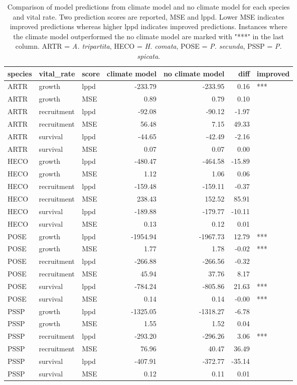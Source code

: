 \begin{table}[ht]
\centering
\caption{Comparison of model predictions from climate model and no climate model for each species and vital rate.  Two prediction scores are reported, MSE and lppd. Lower MSE indicates improved predictions whereas higher lppd indicates improved predictions.  Instances where the climate model outperformed the no climate model are marked with "***" in the last column. ARTR = \textit{A. tripartita}, HECO = \textit{H. comata}, POSE = \textit{P. secunda}, PSSP = \textit{P. spicata}.} 
\label{table:overallPreds}
\begin{tabular}{lllrrrl}
  \hline
species & vital\_rate & score & climate model & no climate model & diff & improved \\ 
  \hline
ARTR & growth & lppd & -233.79 & -233.95 & 0.16 & *** \\ 
  ARTR & growth & MSE & 0.89 & 0.79 & 0.10 &  \\ 
  ARTR & recruitment & lppd & -92.08 & -90.12 & -1.97 &  \\ 
  ARTR & recruitment & MSE & 56.48 & 7.15 & 49.33 &  \\ 
  ARTR & survival & lppd & -44.65 & -42.49 & -2.16 &  \\ 
  ARTR & survival & MSE & 0.07 & 0.07 & 0.00 &  \\ 
  HECO & growth & lppd & -480.47 & -464.58 & -15.89 &  \\ 
  HECO & growth & MSE & 1.12 & 1.06 & 0.06 &  \\ 
  HECO & recruitment & lppd & -159.48 & -159.11 & -0.37 &  \\ 
  HECO & recruitment & MSE & 238.43 & 152.52 & 85.91 &  \\ 
  HECO & survival & lppd & -189.88 & -179.77 & -10.11 &  \\ 
  HECO & survival & MSE & 0.13 & 0.12 & 0.01 &  \\ 
  POSE & growth & lppd & -1954.94 & -1967.73 & 12.79 & *** \\ 
  POSE & growth & MSE & 1.77 & 1.78 & -0.02 & *** \\ 
  POSE & recruitment & lppd & -266.88 & -266.56 & -0.32 &  \\ 
  POSE & recruitment & MSE & 45.94 & 37.76 & 8.17 &  \\ 
  POSE & survival & lppd & -784.24 & -805.86 & 21.63 & *** \\ 
  POSE & survival & MSE & 0.14 & 0.14 & -0.00 & *** \\ 
  PSSP & growth & lppd & -1325.05 & -1318.27 & -6.78 &  \\ 
  PSSP & growth & MSE & 1.55 & 1.52 & 0.04 &  \\ 
  PSSP & recruitment & lppd & -293.20 & -296.26 & 3.06 & *** \\ 
  PSSP & recruitment & MSE & 76.96 & 40.47 & 36.49 &  \\ 
  PSSP & survival & lppd & -407.91 & -372.77 & -35.14 &  \\ 
  PSSP & survival & MSE & 0.12 & 0.11 & 0.01 &  \\ 
   \hline
\end{tabular}
\end{table}
